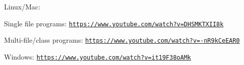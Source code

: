 Linux/\+Mac\+:


\begin{DoxyItemize}
\item Single file programs\+: \href{https://www.youtube.com/watch?v=DHSMKTXII8k}{\tt https\+://www.\+youtube.\+com/watch?v=\+D\+H\+S\+M\+K\+T\+X\+I\+I8k}
\item Multi-\/file/class programs\+: \href{https://www.youtube.com/watch?v=-nR9kCeEAR0}{\tt https\+://www.\+youtube.\+com/watch?v=-\/n\+R9k\+Ce\+E\+A\+R0}
\end{DoxyItemize}

Windows\+: \href{https://www.youtube.com/watch?v=it19F38oAMk}{\tt https\+://www.\+youtube.\+com/watch?v=it19\+F38o\+A\+Mk} 